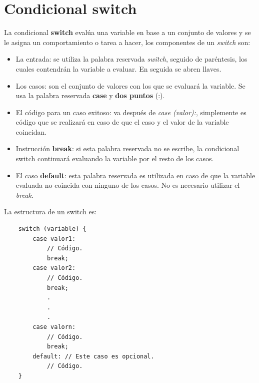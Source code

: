 \section{Condicional switch}
\hspace{0.55cm}La condicional \textbf{switch} evalúa una variable en base a un conjunto de valores y se le asigna un comportamiento o tarea a hacer, los componentes de un \textit{switch} son:
\begin{itemize}
    \item La entrada: se utiliza la palabra reservada \textit{switch}, seguido de paréntesis, los cuales contendrán la variable a evaluar. En seguida se abren llaves.
    \item Los casos: son el conjunto de valores con los que se evaluará la variable. Se usa la palabra reservada \textbf{case} y \textbf{dos puntos} (:).
    \item El código para un caso exitoso: va después de \textit{case (valor):}, simplemente es código que se realizará en caso de que el caso y el valor de la variable coincidan.
    \item Instrucción \textbf{break}: si esta palabra reservada no se escribe, la condicional switch continuará evaluando la variable por el resto de los casos.
    \item El caso \textbf{default}: esta palabra reservada es utilizada en caso de que la variable evaluada no coincida con ninguno de los casos. No es necesario utilizar el \textit{break}.
\end{itemize}

La estructura de un switch es:
\begin{lstlisting}
    switch (variable) {
        case valor1:
            // Código.
            break;
        case valor2:
            // Código.
            break;
            .
            .
            .
        case valorn:
            // Código.
            break;
        default: // Este caso es opcional.
            // Código.
    }
\end{lstlisting}


